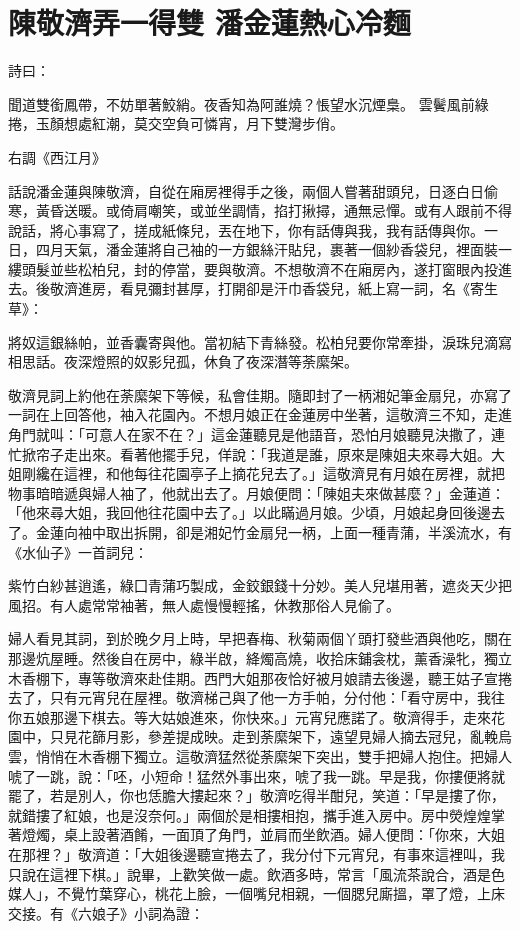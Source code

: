 %

\chapter{陳敬濟弄一得雙 潘金蓮熱心冷麵}

詩曰：

聞道雙銜鳳帶，不妨單著鮫綃。夜香知為阿誰燒？悵望水沉煙梟。
雲鬢風前綠捲，玉顏想處紅潮，莫交空負可憐宵，月下雙灣步俏。

右調《西江月》

話說潘金蓮與陳敬濟，自從在廂房裡得手之後，兩個人嘗著甜頭兒，日逐白日偷寒，黃昏送暖。或倚肩嘲笑，或並坐調情，掐打揪撏，通無忌憚。或有人跟前不得說話，將心事寫了，搓成紙條兒，丟在地下，你有話傳與我，我有話傳與你。一日，四月天氣，潘金蓮將自己袖的一方銀絲汗貼兒，裹著一個紗香袋兒，裡面裝一縷頭髮並些松柏兒，封的停當，要與敬濟。不想敬濟不在廂房內，遂打窗眼內投進去。後敬濟進房，看見彌封甚厚，打開卻是汗巾香袋兒，紙上寫一詞，名《寄生草》：

將奴這銀絲帕，並香囊寄與他。當初結下青絲發。松柏兒要你常牽掛，淚珠兒滴寫相思話。夜深燈照的奴影兒孤，休負了夜深潛等荼縻架。

敬濟見詞上約他在荼縻架下等候，私會佳期。隨即封了一柄湘妃筆金扇兒，亦寫了一詞在上回答他，袖入花園內。不想月娘正在金蓮房中坐著，這敬濟三不知，走進角門就叫：「可意人在家不在？」這金蓮聽見是他語音，恐怕月娘聽見決撒了，連忙掀帘子走出來。看著他擺手兒，佯說：「我道是誰，原來是陳姐夫來尋大姐。大姐剛纔在這裡，和他每往花園亭子上摘花兒去了。」這敬濟見有月娘在房裡，就把物事暗暗遞與婦人袖了，他就出去了。月娘便問：「陳姐夫來做甚麼？」金蓮道： 「他來尋大姐，我回他往花園中去了。」以此瞞過月娘。少頃，月娘起身回後邊去了。金蓮向袖中取出拆開，卻是湘妃竹金扇兒一柄，上面一種青蒲，半溪流水，有《水仙子》一首詞兒：

紫竹白紗甚逍遙，綠囗青蒲巧製成，金鉸銀錢十分妙。美人兒堪用著，遮炎天少把風招。有人處常常袖著，無人處慢慢輕搖，休教那俗人見偷了。

婦人看見其詞，到於晚夕月上時，早把春梅、秋菊兩個丫頭打發些酒與他吃，關在那邊炕屋睡。然後自在房中，綠半啟，絳燭高燒，收拾床鋪衾枕，薰香澡牝，獨立木香棚下，專等敬濟來赴佳期。西門大姐那夜恰好被月娘請去後邊，聽王姑子宣捲去了，只有元宵兒在屋裡。敬濟梯己與了他一方手帕，分付他：「看守房中，我往你五娘那邊下棋去。等大姑娘進來，你快來。」元宵兒應諾了。敬濟得手，走來花園中，只見花篩月影，參差提成映。走到荼縻架下，遠望見婦人摘去冠兒，亂輓烏雲，悄悄在木香棚下獨立。這敬濟猛然從荼縻架下突出，雙手把婦人抱住。把婦人唬了一跳，說：「呸，小短命！猛然外事出來，唬了我一跳。早是我，你摟便將就罷了，若是別人，你也恁膽大摟起來？」敬濟吃得半酣兒，笑道：「早是摟了你，就錯摟了紅娘，也是沒奈何。」兩個於是相摟相抱，攜手進入房中。房中熒煌煌掌著燈燭，桌上設著酒餚，一面頂了角門，並肩而坐飲酒。婦人便問：「你來，大姐在那裡？」敬濟道：「大姐後邊聽宣捲去了，我分付下元宵兒，有事來這裡叫，我只說在這裡下棋。」說畢，上歡笑做一處。飲酒多時，常言「風流茶說合，酒是色媒人」，不覺竹葉穿心，桃花上臉，一個嘴兒相親，一個腮兒廝搵，罩了燈，上床交接。有《六娘子》小詞為證：

